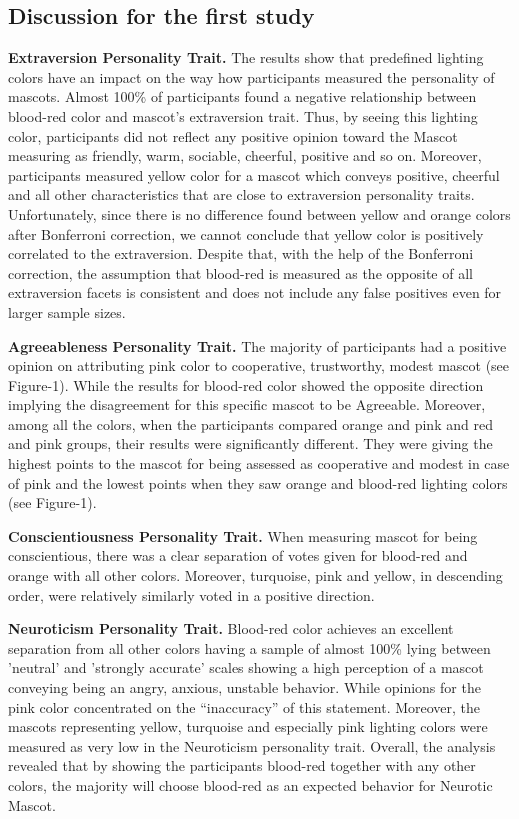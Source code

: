 \subsection{Discussion for the first study}
\par \textbf{Extraversion Personality Trait.} The results show that predefined lighting colors have an impact on the way how participants measured the personality of mascots. Almost 100\% of participants found a negative relationship between blood-red color and mascot's extraversion trait. Thus, by seeing this lighting color, participants did not reflect any positive opinion toward the Mascot measuring as friendly, warm, sociable, cheerful, positive and so on. Moreover, participants measured yellow color for a mascot which conveys positive, cheerful and all other characteristics that are close to extraversion personality traits. Unfortunately, since there is no difference found between yellow and orange colors after Bonferroni correction, we cannot conclude that yellow color is positively correlated to the extraversion. Despite that, with the help of the Bonferroni correction, the assumption that blood-red is measured as the opposite of all extraversion facets is consistent and does not include any false positives even for larger sample sizes. 
\par \textbf{Agreeableness Personality Trait.} The majority of participants had a positive opinion on attributing pink color to cooperative, trustworthy, modest mascot (see Figure-1). While the results for blood-red color showed the opposite direction implying the disagreement for this specific mascot to be Agreeable. Moreover, among all the colors, when the participants compared orange and pink and red and pink groups, their results were significantly different. They were giving the highest points to the mascot for being assessed as cooperative and modest in case of pink and the lowest points when they saw orange and blood-red lighting colors (see Figure-1). 
\par \textbf{Conscientiousness Personality Trait.} When measuring mascot for being conscientious, there was a clear separation of votes given for blood-red and orange with all other colors. Moreover, turquoise, pink and yellow, in descending order, were relatively similarly voted in a positive direction.
\par \textbf{Neuroticism Personality Trait.} Blood-red color achieves an excellent separation from all other colors having a sample of almost 100\% lying between 'neutral' and 'strongly accurate' scales showing a high perception of a mascot conveying being an angry, anxious, unstable behavior. While opinions for the pink color concentrated on the “inaccuracy” of this statement. Moreover, the mascots representing yellow, turquoise and especially pink lighting colors were measured as very low in the Neuroticism personality trait. Overall, the analysis revealed that by showing the participants blood-red together with any other colors, the majority will choose blood-red as an expected behavior for Neurotic Mascot. 
